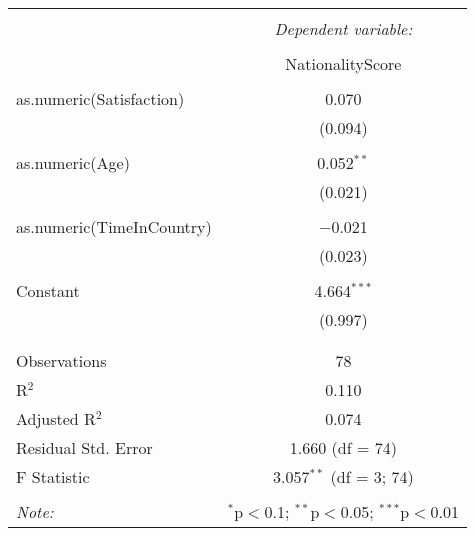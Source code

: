 \documentclass{article}
\begin{document}
\begin{table}[!htbp] \centering 
  \caption{} 
  \label{} 
\begin{tabular}{@{\extracolsep{5pt}}lc} 
\\[-1.8ex]\hline 
\hline \\[-1.8ex] 
 & \multicolumn{1}{c}{\textit{Dependent variable:}} \\ 
\cline{2-2} 
\\[-1.8ex] & NationalityScore \\ 
\hline \\[-1.8ex] 
 as.numeric(Satisfaction) & 0.070 \\ 
  & (0.094) \\ 
  & \\ 
 as.numeric(Age) & 0.052$^{**}$ \\ 
  & (0.021) \\ 
  & \\ 
 as.numeric(TimeInCountry) & $-$0.021 \\ 
  & (0.023) \\ 
  & \\ 
 Constant & 4.664$^{***}$ \\ 
  & (0.997) \\ 
  & \\ 
\hline \\[-1.8ex] 
Observations & 78 \\ 
R$^{2}$ & 0.110 \\ 
Adjusted R$^{2}$ & 0.074 \\ 
Residual Std. Error & 1.660 (df = 74) \\ 
F Statistic & 3.057$^{**}$ (df = 3; 74) \\ 
\hline 
\hline \\[-1.8ex] 
\textit{Note:}  & \multicolumn{1}{r}{$^{*}$p$<$0.1; $^{**}$p$<$0.05; $^{***}$p$<$0.01} \\ 
\end{tabular} 
\end{table} 
\end{document}
